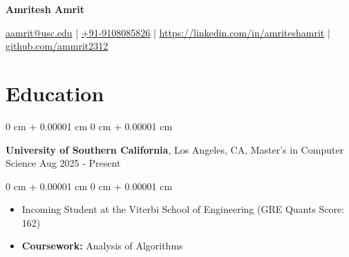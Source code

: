 \documentclass[10pt, a4paper]{article}
\newenvironment{highlights}{
    \begin{itemize}[
        topsep=0 cm,
        parsep=0 cm,
        partopsep=0pt,
        itemsep=0pt,
        leftmargin=0 cm + 10pt
    ]
}{
    \end{itemize}
} %
\newenvironment{onecolentry}{
    \begin{adjustwidth}{
        0 cm + 0.00001 cm
    }{
        0 cm + 0.00001 cm
    }
}{
    \end{adjustwidth}
} %
\newenvironment{twocolentry}[2][]{
    \onecolentry
    \def\secondColumn{#2}
    \setcolumnwidth{\fill, 6.0 cm}
    \begin{paracol}{2}
}{
    \switchcolumn \raggedleft \secondColumn
    \end{paracol}
    \endonecolentry
} %
\newenvironment{header}{
    \setlength{\topsep}{0pt}\par\kern\topsep\centering\linespread{1.0}
}{
    \par\kern\topsep
} %
\begin{document}
    \newcommand{\AND}{\unskip
        \cleaders\copy\ANDbox\hskip\wd\ANDbox
        \ignorespaces
    }
    \newsavebox\ANDbox
    \sbox\ANDbox{$|$}

    \begin{header}
    \fontsize{20 pt}{20 pt}\selectfont \textbf{Amritesh Amrit}

    \vspace{1pt} %



    \normalsize
    \href{mailto:aamrit@usc.edu}{aamrit@usc.edu} | \href{tel:+91-9108085826}{+91-9108085826} | \href{https://linkedin.com/in/amriteshamrit}{\underline{https://linkedin.com/in/amriteshamrit}} | \href{https://github.com/ammrit2312}{\underline{github.com/ammrit2312}}


\end{header}

    \vspace{5 pt - 0.3 cm}

    \section{Education}
        \begin{twocolentry}{
            Aug 2025 - Present
        }
            \textbf{University of Southern California}, Los Angeles, CA, Master's in Computer Science\end{twocolentry}

        \vspace{0.10 cm}
        \begin{onecolentry}
            \begin{highlights}
                \item Incoming Student at the Viterbi School of Engineering (GRE Quants Score: 162)
                \item \textbf{Coursework:} Analysis of Algorithms
            \end{highlights}
        \end{onecolentry}
\end{document}
